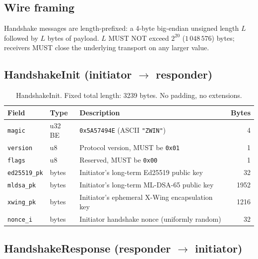 \documentclass[11pt,a4paper]{article}
\begin{document}
\subsection{Wire framing}

Handshake messages are length-prefixed: a 4-byte big-endian unsigned
length $L$ followed by $L$ bytes of payload. $L$ MUST NOT exceed
$2^{20}$ ($1\,048\,576$) bytes; receivers MUST close the underlying
transport on any larger value.

\subsection{HandshakeInit (initiator $\to$ responder)}

\begin{table}[H]
\centering
\begin{tabularx}{\textwidth}{llXr}
\toprule
\textbf{Field} & \textbf{Type} & \textbf{Description} & \textbf{Bytes} \\
\midrule
\texttt{magic}      & u32 BE & \texttt{0x5A57494E} (ASCII \texttt{"ZWIN"})       & 4 \\
\texttt{version}    & u8     & Protocol version, MUST be \texttt{0x01}            & 1 \\
\texttt{flags}      & u8     & Reserved, MUST be \texttt{0x00}                    & 1 \\
\texttt{ed25519\_pk}& bytes  & Initiator's long-term Ed25519 public key           & 32 \\
\texttt{mldsa\_pk}  & bytes  & Initiator's long-term ML-DSA-65 public key         & 1952 \\
\texttt{xwing\_pk}  & bytes  & Initiator's ephemeral X-Wing encapsulation key     & 1216 \\
\texttt{nonce\_i}   & bytes  & Initiator handshake nonce (uniformly random)       & 32 \\
\bottomrule
\end{tabularx}
\caption{HandshakeInit. Fixed total length: 3239 bytes. No padding, no extensions.}
\end{table}

\subsection{HandshakeResponse (responder $\to$ initiator)}
\end{document}
